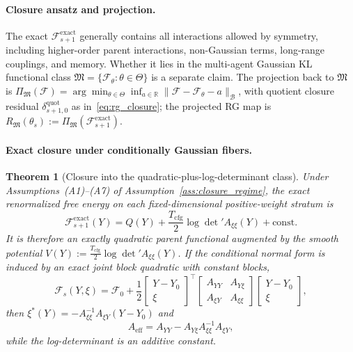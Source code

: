 \documentclass[11pt]{article}
\newtheorem{theorem}{Theorem}
\begin{document}
\paragraph{Closure ansatz and projection.}
The exact $\mathcal{F}_{s+1}^{\mathrm{exact}}$ generally contains all interactions allowed by symmetry, including higher-order parent interactions, non-Gaussian terms, long-range couplings, and memory. Whether it lies in the multi-agent Gaussian KL functional class $\mathfrak{M} = \{\mathcal{F}_\theta : \theta \in \Theta\}$ is a separate claim. The projection back to $\mathfrak{M}$ is $\Pi_\mathfrak{M}(\mathcal{F}) = \arg\min_{\theta \in \Theta} \inf_{a \in \mathbb{R}}\|\mathcal{F} - \mathcal{F}_\theta - a\|_\mathcal{B}$, with quotient closure residual $\delta_{s+1,0}^{\mathrm{quot}}$ as in~\eqref{eq:rg_closure}; the projected RG map is $R_\mathfrak{M}(\theta_s) := \Pi_\mathfrak{M}(\mathcal{F}_{s+1}^{\mathrm{exact}})$.

\paragraph{Exact closure under conditionally Gaussian fibers.}

\begin{theorem}[Closure into the quadratic-plus-log-determinant class]
\label{thm:rg_exact_closure}
Under Assumptions~(A1)--(A7) of Assumption~\ref{ass:closure_regime}, the exact renormalized free energy on each fixed-dimensional positive-weight stratum is
\begin{equation}
\mathcal{F}_{s+1}^{\mathrm{exact}}(Y)
=Q(Y)+\frac{T_{\mathrm{cfg}}}{2}\log\det{}'A_{\xi\xi}(Y)+\mathrm{const}.
\end{equation}
It is therefore an exactly quadratic parent functional augmented by the smooth potential $V(Y):=\tfrac{T_{\mathrm{cfg}}}{2}\log\det{}'A_{\xi\xi}(Y)$. If the conditional normal form is induced by an exact joint block quadratic with constant blocks,
\begin{equation}
\mathcal{F}_s(Y,\xi)
=\mathcal{F}_0+\frac12
\begin{bmatrix}Y-Y_0\\ \xi\end{bmatrix}^{\top}
\begin{bmatrix}A_{YY}&A_{Y\xi}\\ A_{\xi Y}&A_{\xi\xi}\end{bmatrix}
\begin{bmatrix}Y-Y_0\\ \xi\end{bmatrix},
\end{equation}
then $\xi^*(Y)=-A_{\xi\xi}^{-1}A_{\xi Y}(Y-Y_0)$ and
\begin{equation}
A_{\mathrm{eff}}=A_{YY}-A_{Y\xi}A_{\xi\xi}^{-1}A_{\xi Y},
\label{eq:rg_app_schur_complement}
\end{equation}
while the log-determinant is an additive constant.
\end{theorem}
\end{document}
